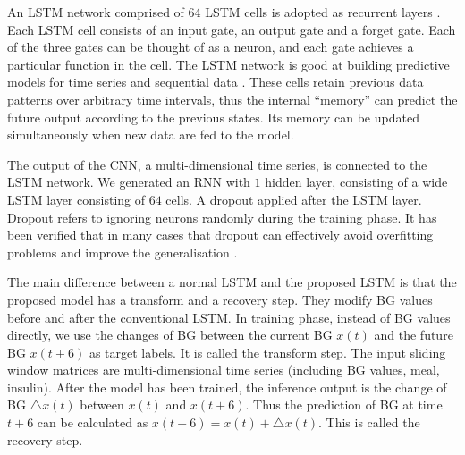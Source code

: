 \documentclass[a4paper, 10 pt, twocolumn]{IEEEtran}
\begin{document}
 An LSTM network comprised of 64 LSTM cells is adopted as recurrent layers \cite{Hochreiter-LongShort}. Each LSTM cell consists of an input gate, an output gate and a forget gate. Each of the three gates can be thought of
 as a neuron, and each gate achieves a particular function in the cell. The LSTM network is good at building predictive models for time series and sequential data \cite{Graves-SpeechRecognition}. These cells retain
 previous data patterns over arbitrary time intervals, thus the internal ``memory'' can predict the future output according to the previous states. Its memory  {can be} updated simultaneously when new data are fed to the
 model.

The output of the CNN, {a multi-dimensional time series, is connected to the LSTM network. We generated an RNN with $1$ hidden layer}, consisting of a wide LSTM layer consisting of $64$ cells. A dropout applied after the
LSTM layer. Dropout refers to ignoring neurons randomly during the training phase. It has been verified that in many cases that dropout can effectively avoid overfitting problems and improve the generalisation
\cite{Srivastava-DropoutASimple}.

The main difference between a normal LSTM and the proposed LSTM is that the proposed model {has a transform and a recovery step. They modify BG values before and after the conventional LSTM. In training phase}, instead of
BG values directly, we use the changes of BG between the current BG $x(t)$ and the future BG $x(t+6)$ as target labels. It is called the transform step. The input sliding window matrices are multi-dimensional time series
(including BG values, meal, insulin). After the model has been trained, the inference output is the change of BG $\triangle x(t)$ between $x(t)$ and $x(t+6)$. Thus the prediction of BG at time $t+6$ can be calculated as
$x(t+6) = x(t) + \triangle x(t)$. This is called the recovery step. %
\end{document}
